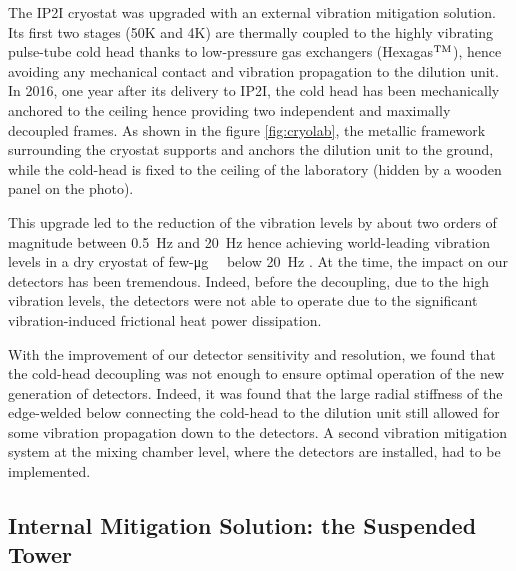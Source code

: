 The IP2I cryostat was upgraded with an external vibration mitigation solution. Its first two stages (50K and 4K) are thermally coupled to the highly vibrating pulse-tube cold head thanks to low-pressure gas exchangers (Hexagas$^{\rm TM}$), hence avoiding any mechanical contact and vibration propagation to the dilution unit. In 2016, one year after its delivery to IP2I, the cold head has been mechanically anchored to the ceiling hence providing two independent and maximally decoupled frames. As shown in the figure \ref{fig:cryolab}, the metallic framework surrounding the cryostat supports and anchors the dilution unit to the ground, while the cold-head is fixed to the ceiling of the laboratory (hidden by a wooden panel on the photo).

This upgrade led to the reduction of the vibration levels by about two orders of magnitude between \SI{0.5}{\Hz} and \SI{20}{\Hz} hence achieving world-leading vibration levels in a dry cryostat of few-\si{\micro g \per \sqrthz} below \SI{20}{\Hz} \cite{Olivieri:2017lqz}.
At the time, the impact on our detectors has been tremendous. Indeed, before the decoupling, due to the high vibration levels, the detectors were not able to operate due to the significant vibration-induced  frictional heat power dissipation. 

With the improvement of our detector sensitivity and resolution, we found that the cold-head decoupling was not enough to ensure optimal operation of the new generation of detectors. Indeed, it was found that the large radial stiffness of the edge-welded below connecting the cold-head to the dilution unit still allowed for some vibration propagation down to the detectors. A second vibration mitigation system at the mixing chamber level, where the detectors are installed, had to be implemented.


\subsection{Internal Mitigation Solution: the Suspended Tower}


